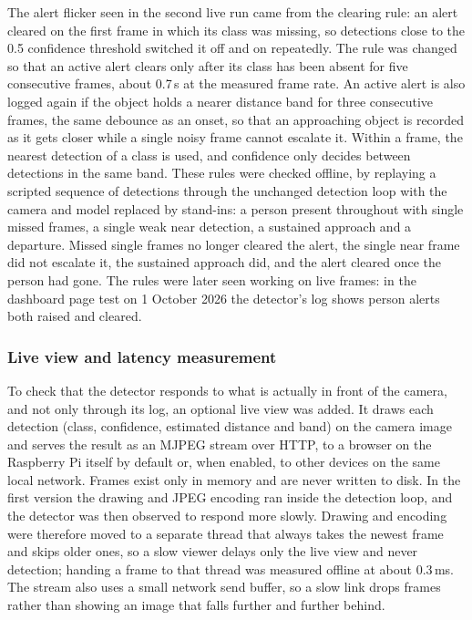 The alert flicker seen in the second live run came from the clearing rule: an alert cleared on the first frame in which its class was missing, so detections close to the 0.5 confidence threshold switched it off and on repeatedly. The rule was changed so that an active alert clears only after its class has been absent for five consecutive frames, about 0.7\,s at the measured frame rate. An active alert is also logged again if the object holds a nearer distance band for three consecutive frames, the same debounce as an onset, so that an approaching object is recorded as it gets closer while a single noisy frame cannot escalate it. Within a frame, the nearest detection of a class is used, and confidence only decides between detections in the same band. These rules were checked offline, by replaying a scripted sequence of detections through the unchanged detection loop with the camera and model replaced by stand-ins: a person present throughout with single missed frames, a single weak near detection, a sustained approach and a departure. Missed single frames no longer cleared the alert, the single near frame did not escalate it, the sustained approach did, and the alert cleared once the person had gone. The rules were later seen working on live frames: in the dashboard page test on 1 October 2026 the detector's log shows person alerts both raised and cleared.

\subsubsection*{Live view and latency measurement}

To check that the detector responds to what is actually in front of the camera, and not only through its log, an optional live view was added. It draws each detection (class, confidence, estimated distance and band) on the camera image and serves the result as an MJPEG stream over HTTP, to a browser on the Raspberry Pi itself by default or, when enabled, to other devices on the same local network. Frames exist only in memory and are never written to disk. In the first version the drawing and JPEG encoding ran inside the detection loop, and the detector was then observed to respond more slowly. Drawing and encoding were therefore moved to a separate thread that always takes the newest frame and skips older ones, so a slow viewer delays only the live view and never detection; handing a frame to that thread was measured offline at about 0.3\,ms. The stream also uses a small network send buffer, so a slow link drops frames rather than showing an image that falls further and further behind.

